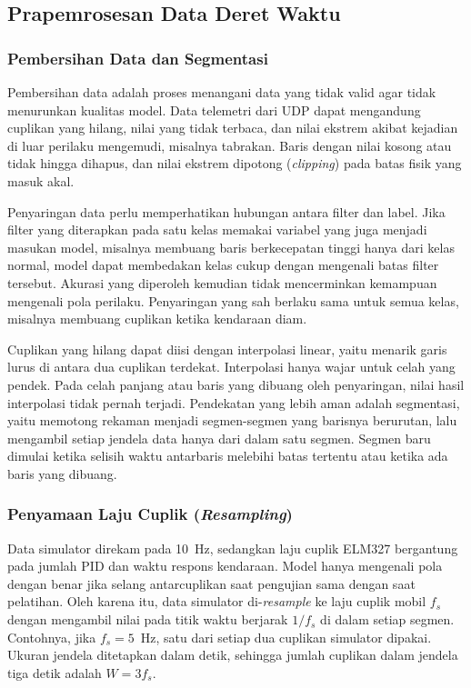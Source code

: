 \subsection{Prapemrosesan Data Deret Waktu}
\subsubsection{Pembersihan Data dan Segmentasi}
Pembersihan data adalah proses menangani data yang tidak valid agar tidak menurunkan kualitas model. Data telemetri dari UDP dapat mengandung cuplikan yang hilang, nilai yang tidak terbaca, dan nilai ekstrem akibat kejadian di luar perilaku mengemudi, misalnya tabrakan. Baris dengan nilai kosong atau tidak hingga dihapus, dan nilai ekstrem dipotong (\textit{clipping}) pada batas fisik yang masuk akal.

Penyaringan data perlu memperhatikan hubungan antara filter dan label. Jika filter yang diterapkan pada satu kelas memakai variabel yang juga menjadi masukan model, misalnya membuang baris berkecepatan tinggi hanya dari kelas normal, model dapat membedakan kelas cukup dengan mengenali batas filter tersebut. Akurasi yang diperoleh kemudian tidak mencerminkan kemampuan mengenali pola perilaku. Penyaringan yang sah berlaku sama untuk semua kelas, misalnya membuang cuplikan ketika kendaraan diam.

Cuplikan yang hilang dapat diisi dengan interpolasi linear, yaitu menarik garis lurus di antara dua cuplikan terdekat. Interpolasi hanya wajar untuk celah yang pendek. Pada celah panjang atau baris yang dibuang oleh penyaringan, nilai hasil interpolasi tidak pernah terjadi. Pendekatan yang lebih aman adalah segmentasi, yaitu memotong rekaman menjadi segmen-segmen yang barisnya berurutan, lalu mengambil setiap jendela data hanya dari dalam satu segmen. Segmen baru dimulai ketika selisih waktu antarbaris melebihi batas tertentu atau ketika ada baris yang dibuang.

\subsubsection{Penyamaan Laju Cuplik (\textit{Resampling})}
Data simulator direkam pada 10~Hz, sedangkan laju cuplik ELM327 bergantung pada jumlah PID dan waktu respons kendaraan. Model hanya mengenali pola dengan benar jika selang antarcuplikan saat pengujian sama dengan saat pelatihan. Oleh karena itu, data simulator di-\textit{resample} ke laju cuplik mobil $f_{s}$ dengan mengambil nilai pada titik waktu berjarak $1/f_{s}$ di dalam setiap segmen. Contohnya, jika $f_{s} = 5$~Hz, satu dari setiap dua cuplikan simulator dipakai. Ukuran jendela ditetapkan dalam detik, sehingga jumlah cuplikan dalam jendela tiga detik adalah $W = 3 f_{s}$.

